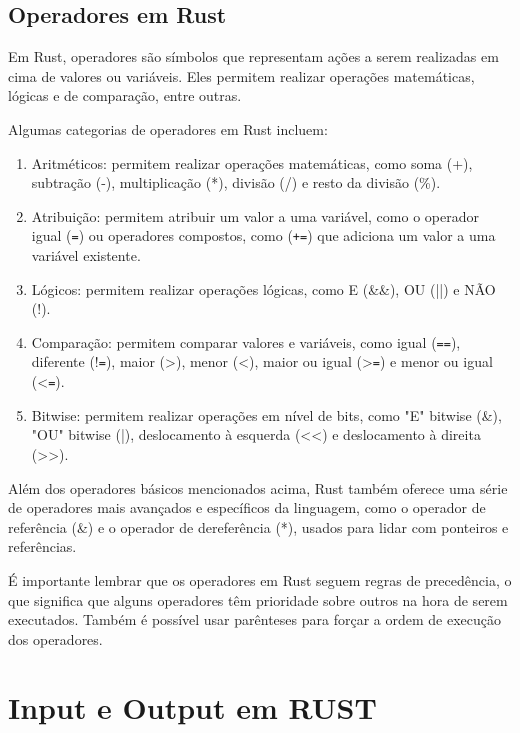 \documentclass[12pt,a4paper,oneside]{abntex2}
\begin{document}
\subsection{Operadores em Rust}

Em Rust, operadores são símbolos que representam ações a serem realizadas em cima de valores ou variáveis. Eles permitem realizar operações matemáticas, lógicas e de comparação, entre outras.

Algumas categorias de operadores em Rust incluem:

\begin{enumerate}
    \item Aritméticos: permitem realizar operações matemáticas, como soma (+), subtração (-), multiplicação (*), divisão (/) e resto da divisão (\%).

\item Atribuição: permitem atribuir um valor a uma variável, como o operador igual (\texttt{=}) ou operadores compostos, como (\texttt{+=}) que adiciona um valor a uma variável existente.

\item Lógicos: permitem realizar operações lógicas, como E (\&\&), OU (||) e NÃO (!).

\item Comparação: permitem comparar valores e variáveis, como igual (\texttt{==}), diferente (!\texttt{=}), maior (>), menor (<), maior ou igual (>\texttt{=}) e menor ou igual (<\texttt{=}).

\item Bitwise: permitem realizar operações em nível de bits, como "E" bitwise (\&), "OU" bitwise (|), deslocamento à esquerda (<<) e deslocamento à direita (>>).
\end{enumerate}


Além dos operadores básicos mencionados acima, Rust também oferece uma série de operadores mais avançados e específicos da linguagem, como o operador de referência (\&) e o operador de dereferência (*), usados para lidar com ponteiros e referências.

É importante lembrar que os operadores em Rust seguem regras de precedência, o que significa que alguns operadores têm prioridade sobre outros na hora de serem executados. Também é possível usar parênteses para forçar a ordem de execução dos operadores.


\section{Input e Output em RUST }
\end{document}
